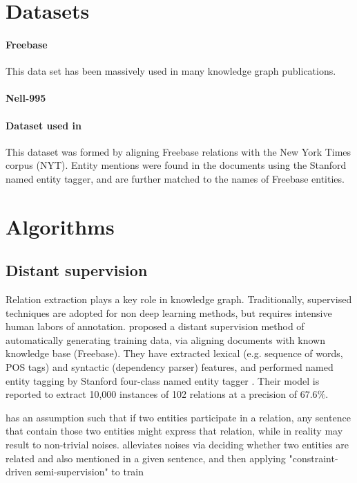 \documentclass{article}
\begin{document}
\section{Datasets}
	
	\paragraph{Freebase} This data set has been massively used in many knowledge graph publications.
	
	\paragraph{Nell-995}
	
	\paragraph{Dataset used in \citet{Riedel2010}} This dataset was formed by aligning Freebase relations with the New York Times corpus (NYT). Entity mentions were found in the documents using the Stanford named entity tagger, and are further matched to the names of Freebase entities.

  
\section{Algorithms}

\subsection{Distant supervision}
	Relation extraction plays a key role in knowledge graph. Traditionally, supervised techniques are adopted for non deep learning methods, but requires intensive human labors of annotation. \citet{Mintz:2009:DSR:1690219.1690287} proposed a distant supervision method of automatically generating training data, via aligning documents with known knowledge base (Freebase). They have extracted lexical (e.g. sequence of words, POS tags) and syntactic (dependency parser) features, and performed named entity tagging by Stanford four-class named entity tagger \citet{Finkel:2005:INI:1219840.1219885}. Their model is reported to extract 10,000 instances of 102 relations at a precision of $67.6\%$.
	
	\citet{Mintz:2009:DSR:1690219.1690287} has an assumption such that if two entities participate in a relation, any sentence that contain those two entities might express that relation, while in reality may result to non-trivial noises. \citet{Riedel2010} alleviates noises via deciding whether two entities are related and also mentioned in a given sentence, and then applying "constraint-driven semi-supervision" to train
\end{document}
